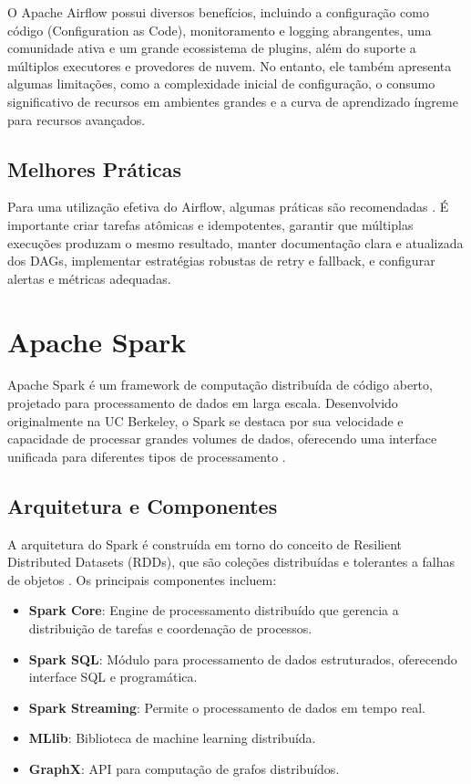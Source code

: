 O Apache Airflow possui diversos benefícios, incluindo a configuração como código (Configuration as Code), monitoramento e logging abrangentes, uma comunidade ativa e um grande ecossistema de plugins, além do suporte a múltiplos executores e provedores de nuvem. No entanto, ele também apresenta algumas limitações, como a complexidade inicial de configuração, o consumo significativo de recursos em ambientes grandes e a curva de aprendizado íngreme para recursos avançados.

\subsection{Melhores Práticas}
Para uma utilização efetiva do Airflow, algumas práticas são recomendadas \cite{airflow_practices}. É importante criar tarefas atômicas e idempotentes, garantir que múltiplas execuções produzam o mesmo resultado, manter documentação clara e atualizada dos DAGs, implementar estratégias robustas de retry e fallback, e configurar alertas e métricas adequadas.

\section{Apache Spark}
Apache Spark é um framework de computação distribuída de código aberto, projetado para processamento de dados em larga escala. Desenvolvido originalmente na UC Berkeley, o Spark se destaca por sua velocidade e capacidade de processar grandes volumes de dados, oferecendo uma interface unificada para diferentes tipos de processamento \cite{zaharia2016apache}.

\subsection{Arquitetura e Componentes}
A arquitetura do Spark é construída em torno do conceito de Resilient Distributed Datasets (RDDs), que são coleções distribuídas e tolerantes a falhas de objetos \cite{karau2023learning}. Os principais componentes incluem:

\begin{itemize}
    \item \textbf{Spark Core}: Engine de processamento distribuído que gerencia a distribuição de tarefas e coordenação de processos.
    \item \textbf{Spark SQL}: Módulo para processamento de dados estruturados, oferecendo interface SQL e programática.
    \item \textbf{Spark Streaming}: Permite o processamento de dados em tempo real.
    \item \textbf{MLlib}: Biblioteca de machine learning distribuída.
    \item \textbf{GraphX}: API para computação de grafos distribuídos.
\end{itemize}

